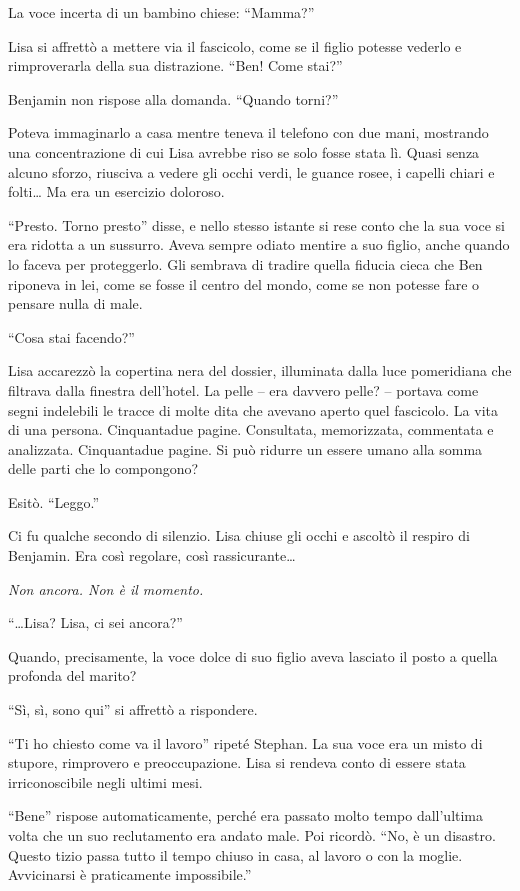 La voce incerta di un bambino chiese: ``Mamma?''

Lisa si affrettò a mettere via il fascicolo, come se il figlio potesse vederlo e rimproverarla della
sua distrazione. ``Ben! Come stai?''

Benjamin non rispose alla domanda. ``Quando torni?''

Poteva immaginarlo a casa mentre teneva il telefono con due mani, mostrando una concentrazione di
cui Lisa avrebbe riso se solo fosse stata lì. Quasi senza alcuno sforzo, riusciva a vedere gli occhi
verdi, le guance rosee, i capelli chiari e folti\dots{} Ma era un esercizio doloroso.

``Presto. Torno presto'' disse, e nello stesso istante si rese conto che la sua voce si era ridotta
a un sussurro. Aveva sempre odiato mentire a suo figlio, anche quando lo faceva per proteggerlo. Gli
sembrava di tradire quella fiducia cieca che Ben riponeva in lei, come se fosse il centro del mondo,
come se non potesse fare o pensare nulla di male.

``Cosa stai facendo?''

Lisa accarezzò la copertina nera del dossier, illuminata dalla luce pomeridiana che filtrava dalla
finestra dell'hotel. La pelle -- era davvero pelle? -- portava come segni indelebili le tracce di
molte dita che avevano aperto quel fascicolo. La vita di una persona. Cinquantadue pagine.
Consultata, memorizzata, commentata e analizzata. Cinquantadue pagine. Si può ridurre un essere
umano alla somma delle parti che lo compongono?

Esitò. ``Leggo.''

Ci fu qualche secondo di silenzio. Lisa chiuse gli occhi e ascoltò il respiro di Benjamin. Era così
regolare, così rassicurante\dots{}

\emph{Non ancora. Non è il momento.}

``\dots{}Lisa? Lisa, ci sei ancora?''

Quando, precisamente, la voce dolce di suo figlio aveva lasciato il posto a quella profonda del
marito?

``Sì, sì, sono qui'' si affrettò a rispondere.

``Ti ho chiesto come va il lavoro'' ripeté Stephan. La sua voce era un misto di stupore, rimprovero
e preoccupazione. Lisa si rendeva conto di essere stata irriconoscibile negli ultimi mesi.

``Bene'' rispose automaticamente, perché era passato molto tempo dall'ultima volta che un suo
reclutamento era andato male. Poi ricordò. ``No, è un disastro. Questo tizio passa tutto il tempo
chiuso in casa, al lavoro o con la moglie. Avvicinarsi è praticamente impossibile.''

